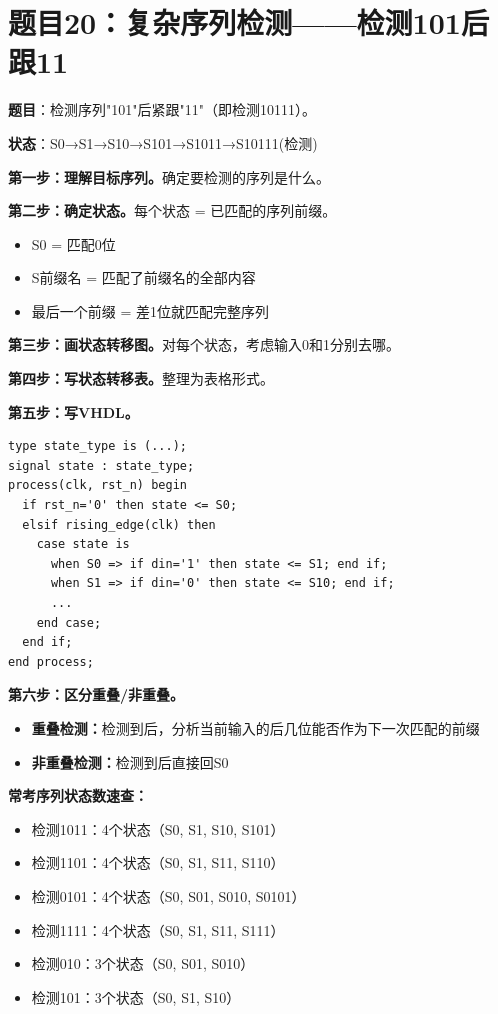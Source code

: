 \section*{题目20：复杂序列检测——检测101后跟11}

\textbf{题目}：检测序列"101"后紧跟"11"（即检测10111）。

\textbf{状态}：S0→S1→S10→S101→S1011→S10111(检测)

\begin{examtip}
\textbf{第一步：理解目标序列。}确定要检测的序列是什么。

\textbf{第二步：确定状态。}每个状态 = 已匹配的序列前缀。
\begin{itemize}
  \item S0 = 匹配0位
  \item S前缀名 = 匹配了前缀名的全部内容
  \item 最后一个前缀 = 差1位就匹配完整序列
\end{itemize}

\textbf{第三步：画状态转移图。}对每个状态，考虑输入0和1分别去哪。

\textbf{第四步：写状态转移表。}整理为表格形式。

\textbf{第五步：写VHDL。}
\end{examtip}

\begin{lstlisting}
type state_type is (...);
signal state : state_type;
process(clk, rst_n) begin
  if rst_n='0' then state <= S0;
  elsif rising_edge(clk) then
    case state is
      when S0 => if din='1' then state <= S1; end if;
      when S1 => if din='0' then state <= S10; end if;
      ...
    end case;
  end if;
end process;
\end{lstlisting}

\begin{examtip}

\textbf{第六步：区分重叠/非重叠。}
\begin{itemize}
  \item \textbf{重叠检测：}检测到后，分析当前输入的后几位能否作为下一次匹配的前缀
  \item \textbf{非重叠检测：}检测到后直接回S0
\end{itemize}

\textbf{常考序列状态数速查：}
\begin{itemize}
  \item 检测1011：4个状态（S0, S1, S10, S101）
  \item 检测1101：4个状态（S0, S1, S11, S110）
  \item 检测0101：4个状态（S0, S01, S010, S0101）
  \item 检测1111：4个状态（S0, S1, S11, S111）
  \item 检测010：3个状态（S0, S01, S010）
  \item 检测101：3个状态（S0, S1, S10）
\end{itemize}
\end{examtip}

